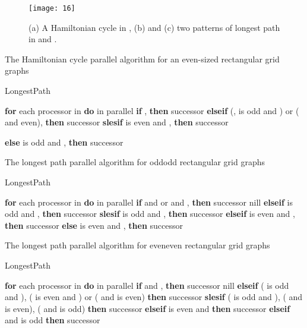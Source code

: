 \documentclass[preprint,12pt]{elsarticle}
\begin{document}
\begin{figure}[htp]
  \centering
  \texttt{[image: 16]}
  \caption[]{(a) A Hamiltonian cycle in , (b) and (c) two patterns of longest path in  and .}
  \label{e}
\end{figure}
\begin{algorithm}
\caption{The Hamiltonian cycle parallel algorithm for an even-sized
rectangular grid graphs} \label{alg:2}
\begin{algorithmic}
\PROC LongestPath
\end{algorithmic}
\begin{algorithmic}[1]
{\small \STATE \textbf{for} each processor  in 
\textbf{do} in parallel \STATE \textbf{if} , \textbf{then}
successor    \STATE \textbf{elseif}
(,  is odd and ) or ( and  even),
\textbf{then} successor   \STATE
\textbf{slesif}  is even and , \textbf{then} successor
  
 \STATE \textbf{else}  is odd and , \textbf{then} successor   }
\end{algorithmic}
\end{algorithm}
\begin{algorithm}
\caption{The longest path parallel algorithm for oddodd
rectangular grid graphs} \label{alg:3}
\begin{algorithmic}
\PROC LongestPath
\end{algorithmic}
\begin{algorithmic}[1]
{\small \STATE \textbf{for} each processor  in 
\textbf{do} in parallel \STATE \textbf{if}  and  or 
and , \textbf{then} successor   nill
\STATE \textbf{elseif}  is odd and , \textbf{then} successor
  \STATE \textbf{slesif}  is odd
and , \textbf{then} successor  
\STATE \textbf{elseif}  is even and , \textbf{then}
successor   
 \STATE \textbf{else}  is even and , \textbf{then} successor   }
\end{algorithmic}
\end{algorithm}


\begin{algorithm}
\caption{The longest path parallel algorithm for eveneven
rectangular grid graphs} \label{alg:4}
\begin{algorithmic}
\PROC LongestPath
\end{algorithmic}
\begin{algorithmic}[1]
{\small \STATE \textbf{for} each processor  in 
\textbf{do} in parallel \STATE \textbf{if}  and ,
\textbf{then} successor   nill \STATE
\textbf{elseif} ( is odd and ), ( is even and ) or
( and  is even)  \textbf{then} successor 
 \STATE \textbf{slesif} ( is odd and
), ( and  is even), ( and  is odd)
\textbf{then} successor   
 \STATE \textbf{elseif}  is even and  \textbf{then} successor   
 \STATE \textbf{elseif}  and  is odd \textbf{then} successor   
 }

\end{algorithmic}
\end{algorithm}
\end{document}
